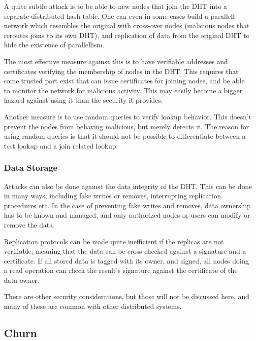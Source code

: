 A quite subtle attack is to be able to  new nodes that join the DHT into
 a separate distributed hash table. One can even in some cases build a parallell
 network which resembles
 the original with cross-over nodes (malicious nodes that reroutes joins to its own DHT),
 and replication of data from the original DHT to hide the existence of parallellism.

The most effective measure against this is to have verifiable addresses and certificates
 verifying the membership of nodes in the DHT. This requires that some trusted part
 exist that can issue certificates for joining nodes, and be able to monitor the network
 for malicious activity. This may easily become a bigger hazard against using it than the
 security it provides.

Another measure is to use random queries to verify lookup behavior. This doesn't
 prevent the nodes from behaving malicious, but merely detects it. The reason for using
 random queries is that it should not be possible to differentiate between a test
 lookup and a join related lookup.

\subsubsection{Data Storage}

Attacks can also be done against the data integrity of the DHT. This can be done in many
 ways; including fake writes or removes, interrupting replication procedures etc. In the
 case of preventing fake writes and removes, data ownership has to be known and managed,
 and only authorized nodes or users can modify or remove the data.

Replication protocols can be made quite inefficient if the replicas are not verifiable;
 meaning that the data can be cross-checked against a signature and a certificate. If all
 stored data is tagged with its owner, and signed, all nodes doing a read operation can
 check the result's signature against the certificate of the data owner.

There are other security considerations, but those will not be discussed here, and many of
these are common with other distributed systems.



\subsection{Churn}
\label{theory:Churn}

